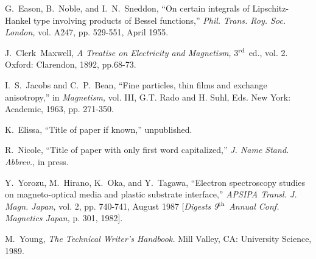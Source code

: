 \documentclass[conference,a4paper]{APSIPA2018}
\begin{document}
\begin{thebibliography}{1}

G.~Eason, B.~Noble, and I.~N.~Sneddon, ``On certain integrals of
Lipschitz-Hankel type involving products of Bessel functions,''
\emph{Phil. Trans. Roy. Soc. London,} vol. A247, pp. 529-551, April
1955.

J.~Clerk~Maxwell, \emph{A Treatise on Electricity and Magnetism,}
3$^{\rm rd}$ ed., vol. 2. Oxford: Clarendon, 1892, pp.68-73.

I.~S.~Jacobs and C.~P.~Bean, ``Fine particles, thin films and exchange
anisotropy,'' in \emph{Magnetism,} vol. III, G.T. Rado and H. Suhl,
Eds. New York: Academic, 1963, pp. 271-350.

K.~Elissa, ``Title of paper if known,'' unpublished.

R.~Nicole, ``Title of paper with only first word capitalized,''
\emph{J. Name Stand. Abbrev.,} in press.

Y.~Yorozu, M.~Hirano, K.~Oka, and Y.~Tagawa, ``Electron spectroscopy
studies on magneto-optical media and plastic substrate interface,''
\emph{APSIPA Transl. J. Magn. Japan,} vol. 2, pp. 740-741, August 1987
[\emph{Digests 9$^{\rm th}$ Annual Conf. Magnetics Japan,} p. 301,
1982].

M.~Young, \emph{The Technical Writer's Handbook.} Mill Valley, CA:
University Science, 1989.

\end{thebibliography}
\end{document}
